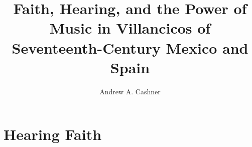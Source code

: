 \documentclass{vcbook}
\begin{document}
\begin{titlingpage}
\title{Faith, Hearing, and the Power of Music in Villancicos of Seventeenth-Century Mexico and Spain}
\author{Andrew A. Cashner}
\maketitle
\end{titlingpage}

\tableofcontents*

\part{Hearing Faith}

% 

% 
% 
% 

% 
% 

\printbibliography
\end{document}
